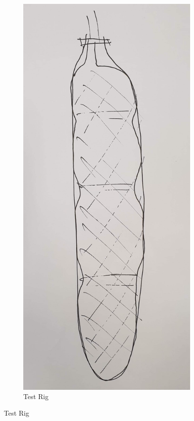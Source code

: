 \documentclass[11pt,a4paper]{article}
\begin{document}
\begin{figure}[!hbt]
    \centering
    \begin{subfigure}[t]{0.95 \textwidth}
        \centering
        \caption{Test Rig}
        \includegraphics[scale=0.08]{MuscleRinging.png}

\end{subfigure}
\end{figure}
\end{document}

